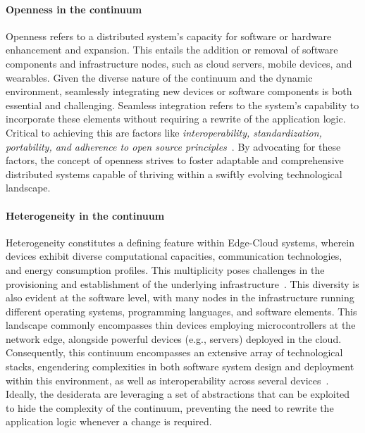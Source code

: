 \documentclass[12pt,a4paper]{article}
\begin{document}
\paragraph{Openness in the continuum}
Openness refers to a distributed system's capacity for software or hardware enhancement and expansion.
%
This entails the addition or removal of software components and infrastructure nodes,
such as cloud servers, mobile devices, and wearables.
%
Given the diverse nature of the continuum and the dynamic environment,
seamlessly integrating new devices or software components is both essential and challenging.
%
Seamless integration refers to the system's capability to incorporate these elements without requiring a rewrite of the application logic.
%
Critical to achieving this are factors like \emph{interoperability, standardization, portability, and adherence to open source principles}~\cite{DBLP:journals/computing/SteenT16}.
%
By advocating for these factors,
the concept of openness strives to foster adaptable and comprehensive distributed systems capable of thriving within a swiftly evolving technological landscape.

\paragraph{Heterogeneity in the continuum}
Heterogeneity constitutes a defining feature within Edge-Cloud systems,
wherein devices exhibit diverse computational capacities,
communication technologies, and energy consumption profiles.
%
This multiplicity poses challenges in the provisioning and establishment of the underlying infrastructure~\cite{DBLP:conf/synasc/VladusicR20}.
%
This diversity is also evident at the software level,
with many nodes in the infrastructure running different operating systems,
programming languages,
and software elements.
%
This landscape commonly encompasses thin devices employing microcontrollers at the network edge,
alongside powerful devices (e.g., servers) deployed in the cloud.
%
Consequently,
this continuum encompasses an extensive array of technological stacks,
engendering complexities in both software system design and deployment within this environment,
as well as interoperability across several devices~\cite{DBLP:journals/midm/TorabMiandoabSJR23}.
%
Ideally,
the desiderata are leveraging a set of abstractions that can be exploited to hide the complexity of the continuum,
preventing the need to rewrite the application logic whenever a change is required.
\end{document}
